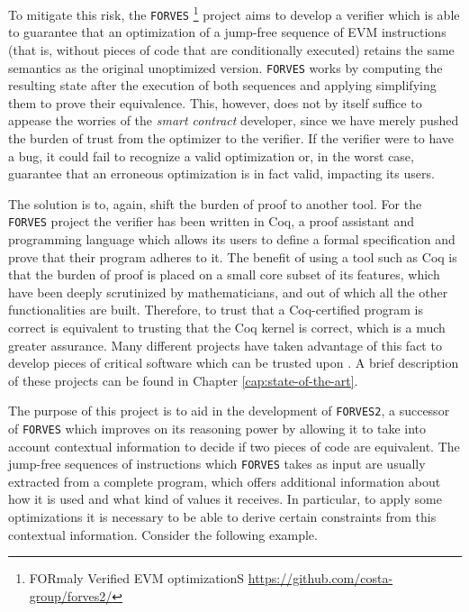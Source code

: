 To mitigate this risk, the \verb|FORVES|
\footnote{FORmaly Verified EVM optimizationS \url{https://github.com/costa-group/forves2/}}
project aims to develop a verifier which is able to guarantee that an optimization of a jump-free
sequence of EVM instructions (that is, without pieces of code that are conditionally executed)
retains the same semantics as the original unoptimized version. \verb|FORVES| works by computing the 
resulting state after the execution of both sequences and applying simplifying them to prove their
equivalence.
This, however, does not by itself suffice to appease the worries of the \emph{smart contract} 
developer, since we have merely pushed the burden of trust from the optimizer to the verifier. If the 
verifier were to have a bug, it could fail to recognize a valid optimization or, in the worst case, 
guarantee that an erroneous optimization is in fact valid, impacting its users.

The solution is to, again, shift the burden of proof to another tool. For the \verb|FORVES| project the 
verifier has been written in Coq, a proof assistant and programming language which allows its users to 
define a formal specification and prove that their program adheres to it. The benefit of using a tool
such as Coq is that the burden of proof is placed on a small core subset of its features, which have
been deeply scrutinized by mathematicians, and out of which all the other functionalities are built.
Therefore, to trust that a Coq-certified program is correct is equivalent to trusting that the Coq  
kernel is correct, which is a much greater assurance. 
Many different projects have taken advantage of this fact to develop pieces of critical software which
can be trusted upon \cite{ConCert,FiatCryptoSP19,CompCert,Iris,Cosette}. A brief description of these projects can be found in Chapter 
    \ref{cap:state-of-the-art}.

The purpose of this project is to aid in the development of \verb|FORVES2|, a successor of \verb|FORVES|
which improves on its reasoning power by allowing it to take into account contextual information to
decide if two pieces of code are equivalent. The jump-free sequences of instructions which \verb|FORVES|
takes as input are usually extracted from a complete program, which offers additional information about
how it is used and what kind of values it receives. In particular, to apply some optimizations it is
necessary to be able to derive certain constraints from this contextual information. Consider the 
following example.

